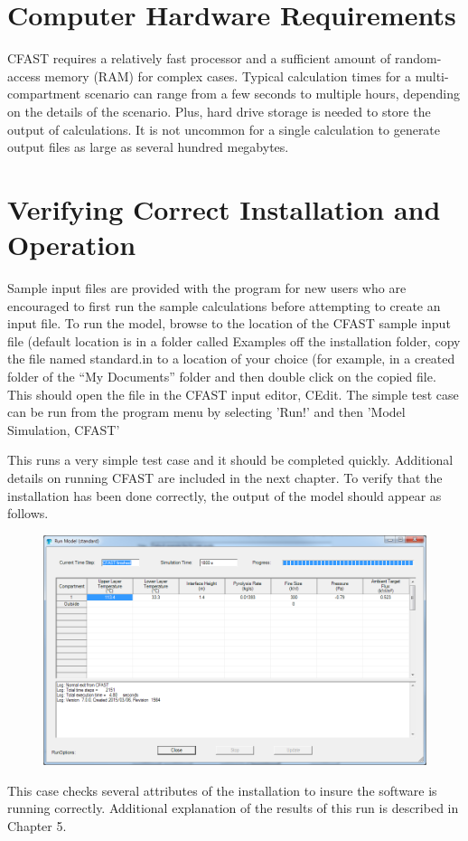 \section{Computer Hardware Requirements}
CFAST requires a relatively fast processor and a sufficient amount of random-access memory (RAM) for complex cases. Typical calculation times for a multi-compartment scenario can range from a few seconds to multiple hours, depending on the details of the scenario. Plus, hard drive storage is needed to store the output of calculations.  It is not uncommon for a single calculation to generate output files as large as several hundred megabytes.

\section{Verifying Correct Installation and Operation}
Sample input files are provided with the program for new users who are encouraged to first run the sample calculations before attempting to create an input file. To run the model, browse to the location of the CFAST sample input file (default location is in a folder called Examples off the installation folder, copy the file named standard.in to a location of your choice (for example, in a created folder of the ``My Documents'' folder and then double click on the copied file.  This should open the file in the CFAST input editor, CEdit.  The simple test case can be run from the program menu by selecting 'Run!' and then 'Model Simulation, CFAST'

This runs a very simple test case and it should be completed quickly. Additional details on running CFAST are included in the next chapter. To verify that the installation has been done correctly, the output of the model should appear as follows.

\begin{figure}[h!]
\begin{center}
\includegraphics[width=6.5in]{FIGURES/Getting_Started/Standard_Output}
\end{center}
\end{figure}

This case checks several attributes of the installation to insure the software is running correctly. Additional explanation of the results of this run is described in Chapter 5.
